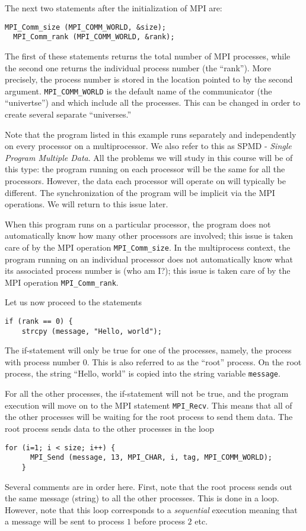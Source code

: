 The next two statements after the initialization of MPI are:
\begin{lstlisting}[style=c]
  MPI_Comm_size (MPI_COMM_WORLD, &size);
  MPI_Comm_rank (MPI_COMM_WORLD, &rank);
\end{lstlisting}
The first of these statements returns the total number of MPI processes, while
the second one returns the individual process number (the ``rank''). More
precisely, the process number is stored in the location pointed to by the second
argument. \texttt{MPI\_COMM\_WORLD} is the default name of the communicator (the
``univertse'') and which include all the processes. This can be changed in order
to create several separate ``universes.''

Note that the program listed in this example runs separately and independently
on every processor on a multiprocessor. We also refer to this as SPMD -
\emph{Single Program Multiple Data}. All the problems we will study in this
course will be of this type: the program running on each processor will be the
same for all the processors. However, the data each processor will operate on
will typically be different. The synchronization of the program will be implicit
via the MPI operations. We will return to this issue later.

When this program runs on a particular processor, the program does not
automatically know how many other processors are involved; this issue is taken
care of by the MPI operation \texttt{MPI\_Comm\_size}. In the multiprocess
context, the program running on an individual processor does not automatically
know what its associated process number is (who am I?); this issue is taken care
of by the MPI operation \texttt{MPI\_Comm\_rank}.

Let us now proceed to the statements
\begin{lstlisting}[style=c]
  if (rank == 0) {
    strcpy (message, "Hello, world");
\end{lstlisting}
The if-statement will only be true for one of the processes, namely, the process
with process number 0. This is also referred to as the ``root'' process. On the
root process, the string ``Hello, world'' is copied into the string variable
\texttt{message}.

For all the other processes, the if-statement will not be true, and the program
execution will move on to the MPI statement \texttt{MPI\_Recv}. This means that
all of the other processes will be waiting for the root process to send them
data. The root process sends data to the other processes in the loop
\begin{lstlisting}[style=c]
    for (i=1; i < size; i++) {
      MPI_Send (message, 13, MPI_CHAR, i, tag, MPI_COMM_WORLD);
    }
\end{lstlisting}
Several comments are in order here. First, note that the root process sends out
the same message (string) to all the other processes. This is done in a loop.
However, note that this loop corresponds to a \emph{sequential} execution
meaning that a message will be sent to process $1$ before process $2$ etc.


